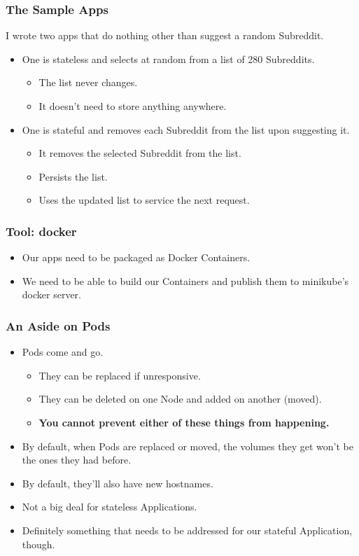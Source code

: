 \documentclass{beamer}
\begin{document}
\begin{frame}
    \frametitle{The Sample Apps}
    I wrote two apps that do nothing other than suggest a random Subreddit.
    \begin{itemize}
        \item One is stateless and selects at random from a list of 280 Subreddits.
        \begin{itemize}
            \item The list never changes.
            \item It doesn't need to store anything anywhere.
        \end{itemize}
        \item One is stateful and removes each Subreddit from the list upon suggesting it.
        \begin{itemize}
            \item It removes the selected Subreddit from the list.
            \item Persists the list.
            \item Uses the updated list to service the next request.
        \end{itemize}
    \end{itemize}
\end{frame}

\begin{frame}
    \frametitle{Tool: docker\footnotemark}
    \begin{itemize}
        \item Our apps need to be packaged as Docker Containers.
        \item We need to be able to build our Containers and publish them to minikube's docker server.
    \end{itemize}
\end{frame}

\begin{frame}
    \frametitle{An Aside on Pods}
    \begin{itemize}
        \item Pods come and go.
        \begin{itemize}
            \item They can be replaced if unresponsive.
            \item They can be deleted on one Node and added on another (moved).
            \item \textbf{You cannot prevent either of these things from happening.}
        \end{itemize}
        \item By default, when Pods are replaced or moved, the volumes they get won't be the ones they had before.
        \item By default, they'll also have new hostnames.
        \item Not a big deal for stateless Applications.
        \item Definitely something that needs to be addressed for our stateful Application, though.
    \end{itemize}
\end{frame}
\end{document}
